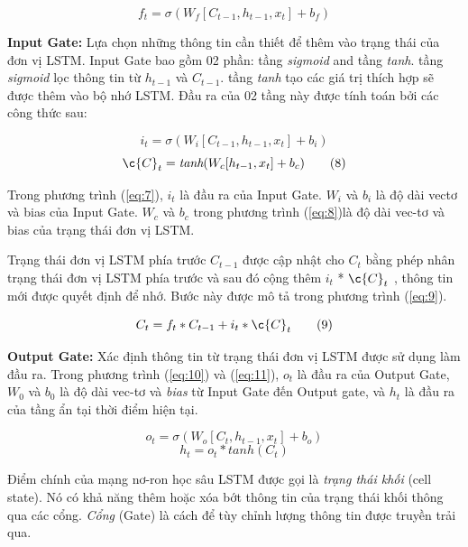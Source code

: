 \begin{equation}
\label{eq:6}
f_t = \sigma(W_f[C_{t-1},h_{t-1},x_t] + b_f)
\tag{6}
\end{equation}

\textbf{Input Gate: } Lựa chọn những thông tin cần thiết để thêm vào trạng thái của đơn vị
LSTM. Input Gate bao gồm 02 phần: tầng \textit{sigmoid} and tầng \textit{tanh}. tầng \textit{sigmoid} lọc thông tin từ $h_{t-1}$ và $C_{t-1}$. tầng \textit{tanh} tạo các giá trị thích hợp sẽ được thêm vào bộ nhớ LSTM. Đầu ra của 02 tầng này được tính toán bởi các công thức sau:

\begin{equation}
\label{eq:7}
i_t = \sigma(W_i[C_{t-1},h_{t-1},x_t] + b_i)
\tag{7}
\end{equation}
\begin{equation}
\label{eq:8}
\c{C}_t = \textit{tanh}(W_c[h_{t-1},x_t] + b_c)
\tag{8}
\end{equation}

Trong phương trình  (\ref{eq:7}), $i_t$ là đầu ra của Input Gate. $W_i$ và $b_i$ là độ dài vectơ và bias của Input Gate. $W_c$ và $b_c$ trong phương trình (\ref{eq:8})là độ dài vec-tơ và bias của trạng thái đơn vị LSTM.

Trạng thái đơn vị LSTM phía trước $C_{t-1}$ được cập nhật cho $C_t$ bằng phép nhân trạng thái đơn vị LSTM phía trước và sau đó cộng thêm $i_t$ * $\c{C}_t$ , thông tin mới được quyết
định để nhớ. Bước này được mô tả trong phương trình (\ref{eq:9}).

\begin{equation}
\label{eq:9}
C_t = f_t * C_{t-1} + i_t * \c{C}_t
\tag{9}
\end{equation}

\textbf{Output Gate: } Xác định thông tin từ trạng thái đơn vị LSTM được sử dụng làm đầu ra. Trong phương trình (\ref{eq:10}) và (\ref{eq:11}), $o_t$ là đầu ra của Output Gate, $W_0$ và $b_0$ là độ dài vec-tơ và \textit{bias} từ Input Gate đến Output gate, và $h_t$ là đầu ra của tầng ẩn tại thời điểm hiện tại.

\begin{equation}
\label{eq:10}
o_t = \sigma(W_o[C_{t},h_{t-1},x_t] + b_o)
\tag{10}
\end{equation}
\begin{equation}
\label{eq:11}
h_t = o_t * tanh(C_t)
\tag{11}
\end{equation}

Điểm chính của mạng nơ-ron học sâu LSTM được gọi là \textit{trạng thái khối} (cell state). Nó có khả năng thêm hoặc xóa bớt thông tin của trạng thái khối thông qua các cổng. \textit{Cổng} (Gate) là cách để tùy chỉnh lượng thông tin được truyền trải qua.


